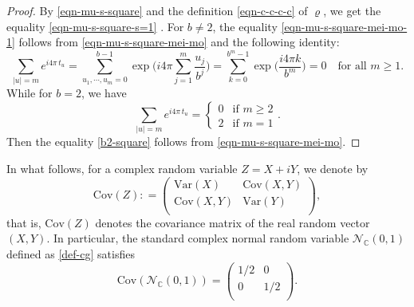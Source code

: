 \documentclass[12pt]{amsart}
\theoremstyle{definition}
\theoremstyle{remark}
\newcommand{\C}{\mathbb{C}}
\newcommand{\Var}{\mathrm{Var}}
\newcommand{\Cov}{\mathrm{Cov}}
\numberwithin{equation}{section}
\begin{document}
\begin{proof}
By \eqref{eqn-mu-s-square} and the definition \eqref{eqn-c-c-c-c} of $\varrho$, we get 
the equality \eqref{eqn-mu-s-square-s=1} . 
For $b \ne 2$, the equality \eqref{eqn-mu-s-square-mei-mo-1} follows from  \eqref{eqn-mu-s-square-mei-mo} and the following identity: 
\[
\sum_{|u|=m}  e^{i 4\pi \, t_u}=     \sum_{u_1, \cdots, u_m = 0}^{b-1} \exp\Big( i 4 \pi   \sum_{j=1}^{m} \frac{u_j}{b^j}\Big)  =  \sum_{k = 0}^{b^{m}-1} \exp\Big( \frac{i 4 \pi k}{b^m}\Big) = 0 \quad \text{for all $m\ge 1$}.
\]
While for $b =2$, we have 
\[
\sum_{|u|=m}  e^{i 4\pi \, t_u} = 
\left\{
\begin{array}{cl}
0 & \text{if $m\ge 2$}
 \\
2 & \text{if $m =1$}
\end{array}
\right..
\]
Then the equality \eqref{b2-square} follows from \eqref{eqn-mu-s-square-mei-mo}. 
\end{proof}










In what follows, for a complex random variable $Z=X+iY$,  we denote by 
\[
\mathrm{Cov}(Z): =      \begin{pmatrix}
\Var(X) & \Cov(X, Y)\\
\Cov(X, Y) &\Var(Y) \\
\end{pmatrix}, 
\]
that is, $\mathrm{Cov}(Z)$ denotes the covariance matrix of the real random vector $(X, Y)$.  In particular, the standard complex normal random variable $\mathcal{N}_\C(0,1)$ defined as \eqref{def-cg} satisfies 
\[
\mathrm{Cov}(\mathcal{N}_\C(0,1))  =  \begin{pmatrix}
1/2 & 0 \\
0 & 1/2\\
\end{pmatrix}. 
\]
\end{document}
